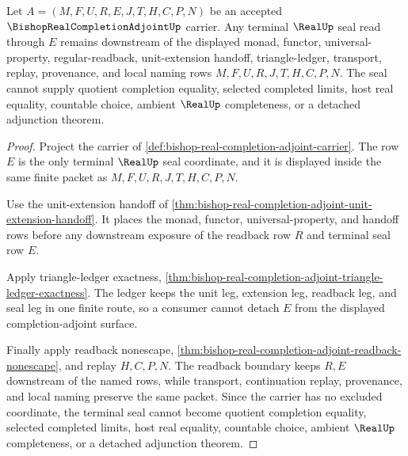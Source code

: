 \begin{theorem}
\label{thm:bishop-real-completion-adjoint-seal-nonescape}
Let $A=(M,F,U,R,E,J,T,H,C,P,N)$ be an accepted $\BishopRealCompletionAdjointUp$ carrier. Any terminal $\RealUp$ seal read through $E$ remains downstream of the displayed monad, functor, universal-property, regular-readback, unit-extension handoff, triangle-ledger, transport, replay, provenance, and local naming rows $M,F,U,R,J,T,H,C,P,N$. The seal cannot supply quotient completion equality, selected completed limits, host real equality, countable choice, ambient $\RealUp$ completeness, or a detached adjunction theorem.
\end{theorem}
\begin{proof}
Project the carrier of \autoref{def:bishop-real-completion-adjoint-carrier}. The row $E$ is the only terminal $\RealUp$ seal coordinate, and it is displayed inside the same finite packet as $M,F,U,R,J,T,H,C,P,N$.

Use the unit-extension handoff of \autoref{thm:bishop-real-completion-adjoint-unit-extension-handoff}. It places the monad, functor, universal-property, and handoff rows before any downstream exposure of the readback row $R$ and terminal seal row $E$.

Apply triangle-ledger exactness, \autoref{thm:bishop-real-completion-adjoint-triangle-ledger-exactness}. The ledger keeps the unit leg, extension leg, readback leg, and seal leg in one finite route, so a consumer cannot detach $E$ from the displayed completion-adjoint surface.

Finally apply readback nonescape, \autoref{thm:bishop-real-completion-adjoint-readback-nonescape}, and replay $H,C,P,N$. The readback boundary keeps $R,E$ downstream of the named rows, while transport, continuation replay, provenance, and local naming preserve the same packet. Since the carrier has no excluded coordinate, the terminal seal cannot become quotient completion equality, selected completed limits, host real equality, countable choice, ambient $\RealUp$ completeness, or a detached adjunction theorem.
\end{proof}

